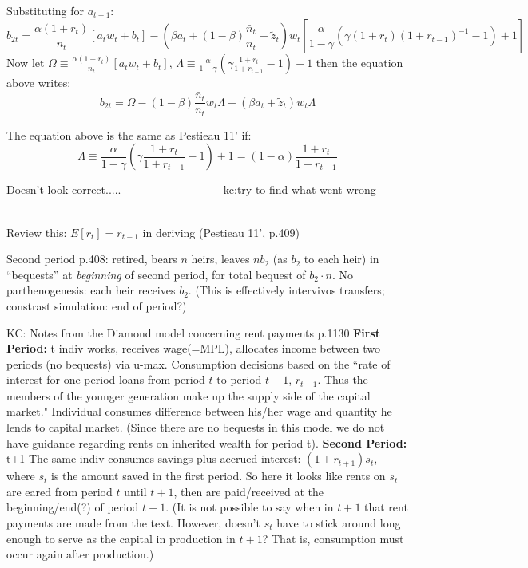 \documentclass{article}
\begin{document}
Substituting for $a_{t+1}$:
\begin{equation*}
b_{2t} = \frac{\alpha(1+r_t)}{n_t}[a_t w_t + b_t] - (\beta a_t + (1-\beta)\frac{\bar{n}_t}{n_t}+\tilde{z}_t) w_t [\frac{\alpha}{1-\gamma}(\gamma(1+r_t)(1+r_{t-1})^{-1} -1) + 1]
\end{equation*}
Now let $\Omega \equiv \frac{\alpha(1+r_t)}{n_t}[a_t w_t + b_t]$, $\Lambda \equiv \frac{\alpha}{1-\gamma}(\gamma\frac{1+r_t}{1+r_{t-1}} - 1) +1$ then the equation above writes:
\begin{equation}
b_{2t} = \Omega - (1-\beta)\frac{\bar{n}_t}{n_t}w_t\Lambda - (\beta a_t+\tilde{z}_t)w_t\Lambda
\end{equation}

The equation above is the same as Pestieau 11' if:
\begin{equation*}
\Lambda \equiv \frac{\alpha}{1-\gamma}(\gamma\frac{1+r_t}{1+r_{t-1}} - 1) +1 = (1-\alpha)\frac{1+r_t}{1+r_{t-1}}
\end{equation*}

Doesn't look correct.....\newline
--------------------------\newline
kc:try to find what went wrong\newline
--------------------------


Review this:
$E[r_t] = r_{t-1}$ in deriving (Pestieau 11',  p.409)

Second period p.408:
retired,
bears $n$ heirs,
leaves $n b_{2}$ (as $b_{2}$ to each heir) in ``bequests'' at \emph{beginning} of second period,
for total bequest of $b_{2} \cdot n$.
No parthenogenesis: each heir receives $b_{2}$.
(This is effectively intervivos transfers;
constrast simulation: end of period?)\newline

KC: Notes from the Diamond model concerning rent payments p.1130\newline
\textbf{First Period:} t\newline
indiv works, receives wage(=MPL), allocates income between two periods (no bequests) via u-max.\newline
Consumption decisions based on the ``rate of interest for one-period loans from period $t$ to period $t+1$, $r_{t+1}$.  Thus the members of the younger generation make up the supply side of the capital market."\newline
Individual consumes difference between his/her wage and quantity he lends to capital market.  (Since there are no bequests in this model we do not have guidance regarding rents on inherited wealth for period t).\newline
\noindent\textbf{Second Period:} t+1 \newline
The same indiv consumes savings plus accrued interest: $(1+r_{t+1})s_t$, where $s_t$ is the amount saved in the first period.  So here it looks like rents on $s_t$ are eared from period $t$ until $t+1$, then are paid/received at the beginning/end(?) of period $t+1$.  (It is not possible to say when in $t+1$ that rent payments are made from the text.  However, doesn't $s_t$ have to stick around long enough to serve as the capital in production in $t+1$?  That is, consumption must occur again after production.)
\end{document}
